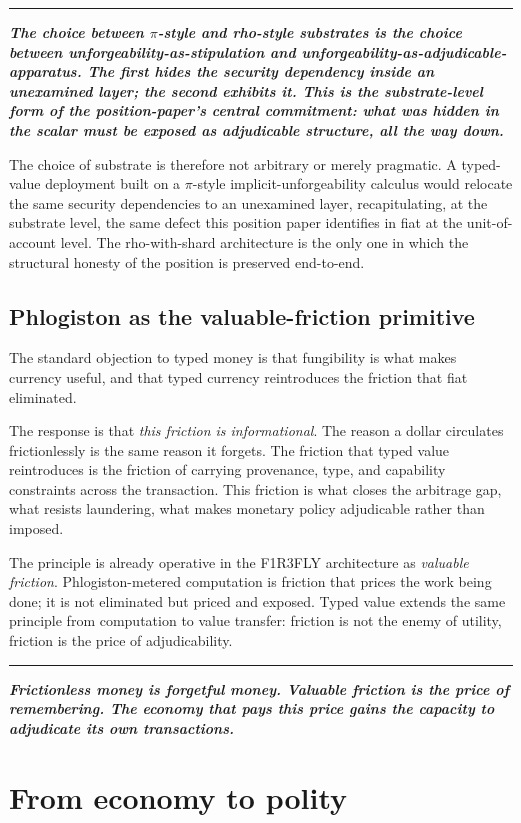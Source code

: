 \documentclass[11pt]{article}
\newcommand{\position}[1]{%
  \medskip
  \begin{quoting}[indentfirst=false, leftmargin=1em, rightmargin=1em]
  \noindent\textcolor{rhosky}{\rule{3pt}{1.2em}}\hspace{0.5em}\textbf{\textit{#1}}
  \end{quoting}
  \medskip
}
\begin{document}
\position{The choice between $\pi$-style and rho-style substrates is the choice between unforgeability-as-stipulation and unforgeability-as-adjudicable-apparatus. The first hides the security dependency inside an unexamined layer; the second exhibits it. This is the substrate-level form of the position-paper's central commitment: what was hidden in the scalar must be exposed as adjudicable structure, all the way down.}

The choice of substrate is therefore not arbitrary or merely pragmatic. A typed-value deployment built on a $\pi$-style implicit-unforgeability calculus would relocate the same security dependencies to an unexamined layer, recapitulating, at the substrate level, the same defect this position paper identifies in fiat at the unit-of-account level. The rho-with-shard architecture is the only one in which the structural honesty of the position is preserved end-to-end.

\subsection{Phlogiston as the valuable-friction primitive}

The standard objection to typed money is that fungibility is what makes currency useful, and that typed currency reintroduces the friction that fiat eliminated.

The response is that \emph{this friction is informational}. The reason a dollar circulates frictionlessly is the same reason it forgets. The friction that typed value reintroduces is the friction of carrying provenance, type, and capability constraints across the transaction. This friction is what closes the arbitrage gap, what resists laundering, what makes monetary policy adjudicable rather than imposed.

The principle is already operative in the F1R3FLY architecture as \emph{valuable friction}. Phlogiston-metered computation is friction that prices the work being done; it is not eliminated but priced and exposed. Typed value extends the same principle from computation to value transfer: friction is not the enemy of utility, friction is the price of adjudicability.

\position{Frictionless money is forgetful money. Valuable friction is the price of remembering. The economy that pays this price gains the capacity to adjudicate its own transactions.}

\section{From economy to polity}
\end{document}
